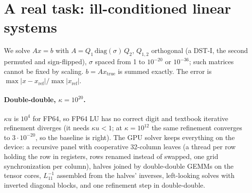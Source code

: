\documentclass[11pt]{article}
\begin{document}
\section{A real task: ill-conditioned linear systems}
We solve $Ax=b$ with $A=Q_1\,\mathrm{diag}(\sigma)\,Q_2$, $Q_{1,2}$ orthogonal (a DST-I, the second permuted and sign-flipped),
$\sigma$ spaced from 1 to $10^{-20}$ or $10^{-36}$; such matrices cannot be fixed by scaling. $b=Ax_{\mathrm{true}}$ is summed
exactly. The error is $\max|x-x_{\mathrm{ref}}|/\max|x_{\mathrm{ref}}|$.

\paragraph{Double-double, $\kappa=10^{20}$.} $\kappa u$ is $10^4$ for FP64, so FP64 LU has no correct digit and textbook
iterative refinement diverges (it needs $\kappa u<1$; at $\kappa=10^{12}$ the same refinement converges to $3\cdot10^{-20}$, so
the baseline is right). The GPU solver keeps everything on the device: a recursive panel with cooperative 32-column leaves (a
thread per row holding the row in registers, rows renamed instead of swapped, one grid synchronization per column), halves
joined by double-double GEMMs on the tensor cores, $L_{11}^{-1}$ assembled from the halves' inverses, left-looking solves with
inverted diagonal blocks, and one refinement step in double-double.
\end{document}
